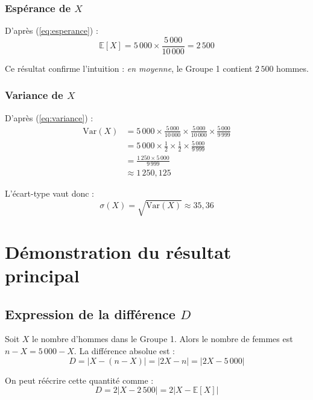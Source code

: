 \documentclass[11pt,a4paper]{article}
\theoremstyle{definition}
\theoremstyle{remark}
\begin{document}
\subsubsection{Espérance de $X$}

D'après (\ref{eq:esperance}) :
\begin{equation}
\mathbb{E}[X] = 5\,000 \times \frac{5\,000}{10\,000} = 2\,500
\end{equation}

Ce résultat confirme l'intuition : \textit{en moyenne}, le Groupe 1 contient $2\,500$ hommes.

\subsubsection{Variance de $X$}

D'après (\ref{eq:variance}) :
\begin{align}
\text{Var}(X) &= 5\,000 \times \frac{5\,000}{10\,000} \times \frac{5\,000}{10\,000} \times \frac{5\,000}{9\,999}\\
&= 5\,000 \times \frac{1}{2} \times \frac{1}{2} \times \frac{5\,000}{9\,999}\\
&= \frac{1\,250 \times 5\,000}{9\,999}\\
&\approx 1\,250{,}125
\end{align}

L'écart-type vaut donc :
\begin{equation}
\sigma(X) = \sqrt{\text{Var}(X)} \approx 35{,}36
\end{equation}

\section{Démonstration du résultat principal}

\subsection{Expression de la différence $D$}

Soit $X$ le nombre d'hommes dans le Groupe 1. Alors le nombre de femmes est $n - X = 5\,000 - X$. La différence absolue est :
\begin{equation}
D = |X - (n - X)| = |2X - n| = |2X - 5\,000|
\end{equation}

On peut réécrire cette quantité comme :
\begin{equation}
D = 2|X - 2\,500| = 2|X - \mathbb{E}[X]|
\end{equation}
\end{document}

